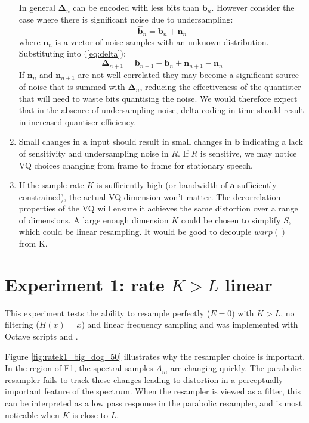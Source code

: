 \documentclass{article}
\begin{document}
\begin{enumerate}
In general $\mathbf{\Delta}_n$ can be encoded with less bits than $\mathbf{b}_n$.  However consider the case where there is significant noise due to undersampling:
\begin{equation}
\mathbf{\hat{b}}_n = \mathbf{b}_{n} + \mathbf{n}_{n}
\end{equation}
where $\mathbf{n}_{n}$ is a vector of noise samples with an unknown distribution. Substituting into (\ref{eq:delta}):
\begin{equation}
\mathbf{\Delta}_{n+1} = \mathbf{b}_{n+1} - \mathbf{b}_{n} + \mathbf{n}_{n+1} - \mathbf{n}_{n}
\end{equation}
If $\mathbf{n}_{n}$ and $\mathbf{n}_{n+1}$ are not well correlated they may become a significant source of noise that is summed with $\mathbf{\Delta}_{n}$, reducing the effectiveness of the quantister that will need to waste bits quantising the noise. We would therefore expect that in the absence of undersampling noise, delta coding in time should result in increased quantiser efficiency.

\item Small changes in $\mathbf{a}$ input should result in small changes in $\mathbf{b}$ indicating a lack of sensitivity and undersampling noise in $R$.  If $R$ is sensitive, we may notice VQ choices changing from frame to frame for stationary speech.

\item If the sample rate $K$ is sufficiently high (or bandwidth of $\mathbf{a}$ sufficiently constrained), the actual VQ dimension won't matter.  The decorrelation properties of the VQ will ensure it achieves the same distortion over a range of dimensions.  A large enough dimension $K$ could be chosen to simplify $S$, which could be linear resampling. It would be good to decouple $warp()$ from K.
\end{enumerate}

\section{Experiment 1: rate $K>L$ linear}

This experiment tests the ability to resample perfectly ($E=0$) with $K>L$, no filtering ($H(x)=x$) and linear frequency sampling and was implemented with Octave scripts  and .

Figure \ref{fig:ratek1_big_dog_50} illustrates why the resampler choice is important.  In the region of F1, the spectral samples $A_{m}$ are changing quickly.  The parabolic resampler fails to track these changes leading to distortion in a perceptually important feature of the spectrum.  When the resampler is viewed as a filter, this can be interpreted as a low pass response in the parabolic resampler, and is most noticable when $K$ is close to $L$.
\end{document}
